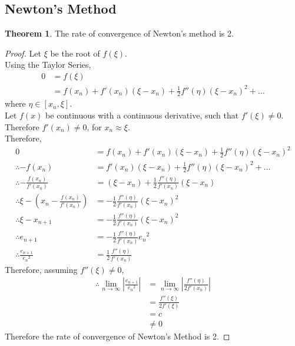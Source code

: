 \documentclass[fleqn, a4paper, 12pt, twoside, titlepage]{article}
\theoremstyle{definition}
\theoremstyle{theorem}
\newtheorem{theorem}{Theorem}
\begin{document}
\subsection{Newton's Method}

\begin{theorem}
	The rate of convergence of Newton's method is 2.
\end{theorem}

\begin{proof}
	Let $\xi$ be the root of $f(\xi)$.\\
	Using the Taylor Series,
	\begin{align*}
		0 &= f(\xi)\\
		&= f(x_n) + f'(x_n) (\xi - x_n) + \frac{1}{2} f''(\eta) (\xi - x_n)^2 + \dots
	\end{align*}
	where $\eta \in [x_n,\xi]$.\\
	Let $f(x)$ be continuous with a continuous derivative, such that $f'(\xi) \neq 0$.\\
	Therefore $f'(x_n) \neq 0$, for $x_n \approx \xi$.\\
	Therefore,
	\begin{align*}
		0 &= f(x_n) + f'(x_n) (\xi - x_n) + \frac{1}{2} f''(\eta) (\xi - x_n)^2\\
		\therefore -f(x_n) &= f'(x_n) (\xi - x_n) + \frac{1}{2} f''(\eta) (\xi - x_n)^2 + \dots\\
		\therefore -\frac{f(x_n)}{f'(x_n)} &= (\xi - x_n) + \frac{1}{2} \frac{f''(\eta)}{f'(x_n)} (\xi - x_n)\\
		\therefore \xi - \left( x_n - \frac{f(x_n)}{f'(x_n)} \right) &= -\frac{1}{2} \frac{f''(\eta)}{f'(x_n)} (\xi - x_n)^2\\
		\therefore \xi - x_{n + 1} &= -\frac{1}{2} \frac{f''(\eta)}{f'(x_n)} (\xi - x_n)^2\\
		\therefore e_{n + 1} &= -\frac{1}{2} \frac{f''(\eta)}{f'(x_n)} {e_n}^2\\
		\therefore \frac{e_{n + 1}}{{e_n}^2} &= \frac{1}{2} \frac{f''(\eta)}{f'(x_n)}
	\end{align*}
	Therefore, assuming $f''(\xi) \neq 0$,
	\begin{align*}
		\therefore \lim\limits_{n \to \infty} \left| \frac{e_{n + 1}}{{e_n}^2} \right| &= \lim\limits_{n \to \infty} \left| \frac{f''(\eta)}{2 f'(x_n)} \right|\\
		&= \frac{f''(\xi)}{2 f'(\xi)}\\
		&= c\\
		&\neq 0
	\end{align*}
	Therefore the rate of convergence of Newton's Method is 2.
\end{proof}
\end{document}
